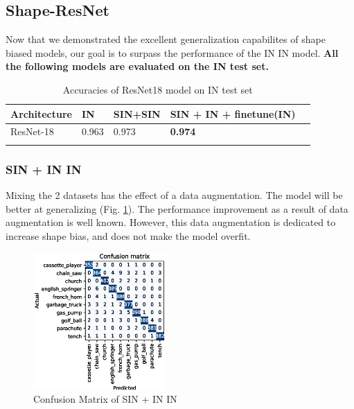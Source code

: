 \documentclass{article}
\begin{document}
\subsection{Shape-ResNet}

Now that we demonstrated the excellent generalization capabilites of shape biased models,
our goal is to surpass the performance of the IN \texorpdfstring{\textrightarrow} .IN model.
\textbf{All the following models are evaluated on the IN test set.}

\begin{table}[h!]
  \begin{tabular}{lllll}
  \Xhline{2\arrayrulewidth}
  Architecture & IN & SIN+SIN  & SIN + IN + finetune(IN) \\ \hline
  ResNet-18    & 0.963    & 0.973   & \textbf{0.974}    \\ \Xhline{2\arrayrulewidth}
  \end{tabular}
  \caption{Accuracies of ResNet18 model on IN test set}
\end{table}


\subsubsection{SIN + IN \texorpdfstring{\textrightarrow} .IN}

Mixing the 2 datasets has the effect of a data augmentation. The model will be better
at generalizing (Fig. \ref{cm_sinin-in}). The performance improvement as a result of data augmentation 
is well known. However, this data augmentation is dedicated to increase shape bias,
and does not make the model overfit.

\begin{figure}[h!]
  \includegraphics[width = 0.45\textwidth]{imgs/sinin/sinin-in_confusion_matrix_0.973.eps}
  \caption{Confusion Matrix of SIN + IN \texorpdfstring{\textrightarrow} .IN}
  \label{cm_sinin-in}
\end{figure}
\end{document}
